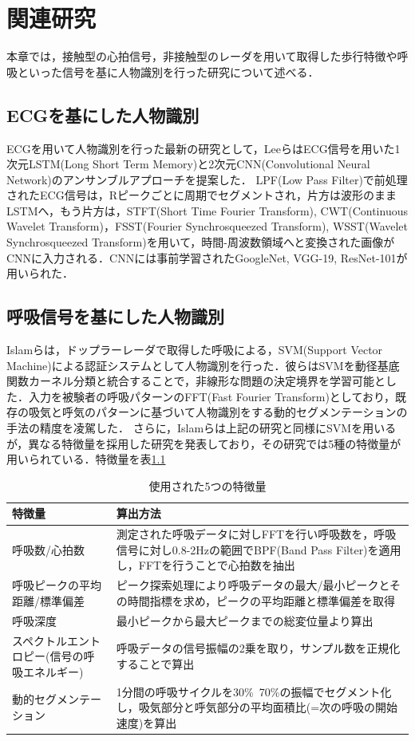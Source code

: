 \chapter{関連研究}
本章では，接触型の心拍信号，非接触型のレーダを用いて取得した歩行特徴や呼吸といった信号を基に人物識別を行った研究について述べる．
\section{ECGを基にした人物識別}
ECGを用いて人物識別を行った最新の研究として，LeeらはECG信号を用いた1次元LSTM(Long Short Term Memory)と2次元CNN(Convolutional Neural Network)のアンサンブルアプローチを提案した\cite{paper:ensemble}．
LPF(Low Pass Filter)で前処理されたECG信号は，Rピークごとに周期でセグメントされ，片方は波形のままLSTMへ，もう片方は，STFT(Short Time Fourier Transform), CWT(Continuous Wavelet Transform)，FSST(Fourier Synchrosqueezed Transform), WSST(Wavelet Synchrosqueezed Transform)を用いて，時間-周波数領域へと変換された画像がCNNに入力される．CNNには事前学習されたGoogleNet, VGG-19, ResNet-101が用いられた．


\section{呼吸信号を基にした人物識別}
Islamらは，ドップラーレーダで取得した呼吸による，SVM(Support Vector Machine)による認証システムとして人物識別を行った\cite{paper:respi_svm}．彼らはSVMを動径基底関数カーネル分類と統合することで，非線形な問題の決定境界を学習可能とした．入力を被験者の呼吸パターンのFFT(Fast Fourier Transform)としており，既存の吸気と呼気のパターンに基づいて人物識別をする動的セグメンテーションの手法\cite{paper:dynamic1}\cite{paper:dynamic2}の精度を凌駕した．
さらに，Islamらは上記の研究と同様にSVMを用いるが，異なる特徴量を採用した研究を発表しており，その研究では5種の特徴量が用いられている．特徴量を表\ref{table:respi}

\begin{table}[H]
\caption{使用された5つの特徴量}
\centering
\begin{tabular}{|p{3cm}|p{6cm}|}
\hline
特徴量 & 算出方法 \\
\hline
呼吸数/心拍数 & 測定された呼吸データに対しFFTを行い呼吸数を，呼吸信号に対し0.8-2Hzの範囲でBPF(Band Pass Filter)を適用し，FFTを行うことで心拍数を抽出 \\ \hline
呼吸ピークの平均距離/標準偏差 & ピーク探索処理により呼吸データの最大/最小ピークとその時間指標を求め，ピークの平均距離と標準偏差を取得 \\ \hline
呼吸深度 & 最小ピークから最大ピークまでの総変位量より算出 \\ \hline
スペクトルエントロピー(信号の呼吸エネルギー) & 呼吸データの信号振幅の2乗を取り，サンプル数を正規化することで算出 \\ \hline
動的セグメンテーション & 1分間の呼吸サイクルを30\%~70\%の振幅でセグメント化し，吸気部分と呼気部分の平均面積比(=次の呼吸の開始速度)を算出 \\
\hline
\end{tabular}
\label{table:respi}
\end{table}

